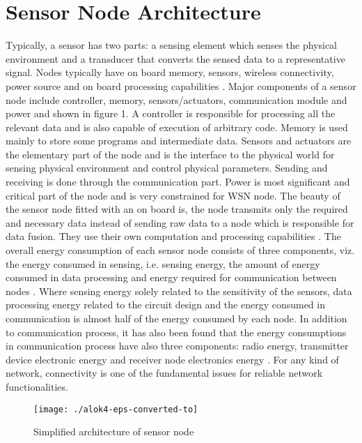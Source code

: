 \documentclass[12pt,journal,communications surveys and tutorials]{IEEEtran}
\begin{document}
\section{Sensor Node Architecture}
Typically, a sensor has two parts: a sensing element which senses the physical environment and a transducer that converts the sensed data to a representative signal. Nodes typically have on board memory, sensors, wireless connectivity, power source and on board processing capabilities \cite{sammarco2007technology}. Major components of a sensor node include controller, memory, sensors/actuators, communication module and power and shown in figure 1. A controller is responsible for processing all the relevant data and is also capable of execution of arbitrary code. Memory is used mainly to store some programs and intermediate data. Sensors and actuators are the elementary part of the node and is the interface to the physical world for sensing physical environment and control physical parameters. Sending and receiving is done through the communication part. Power is most significant and critical part of the node and is very constrained for WSN node. The beauty of the sensor node fitted with an on board is, the node transmits only the required and necessary data instead of sending raw data to a node which is responsible for data fusion. They use their own computation and processing capabilities \cite{Akyildiz2002}. The overall energy consumption of each sensor node consists of three components, viz. the energy consumed in sensing, i.e. sensing energy, the amount of energy consumed in data processing and energy required for communication between nodes \cite{chen2005chain}. Where sensing energy solely related to the sensitivity of the sensors, data processing energy related to the circuit design and the energy consumed in communication is almost half of the energy consumed by each node. In addition to communication process, it has also been found that the energy consumptions in communication process have also three components: radio energy, transmitter device electronic energy and receiver node electronics energy \cite{zhou2008reliable}. For any kind of network, connectivity is one of the fundamental issues for reliable network functionalities.
\begin{figure}[t]
\centering
\texttt{[image: ./alok4-eps-converted-to]}
\caption{Simplified architecture of sensor node}
\label{fig:alok4-eps-converted-to}
\end{figure}
\end{document}
